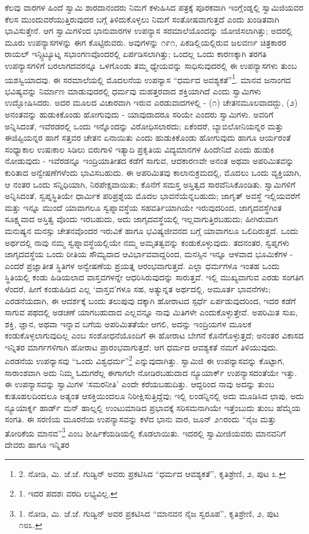 ಕೆಲವು ವಾರಗಳ ಹಿಂದೆ ಸ್ವಾಮಿ ಶಾರದಾನಂದರು ನಿಮಗೆ ಕಳುಹಿಸಿದ ಪತ್ರಕ್ಕೆ ಪೂರಕವಾಗಿ ಇಂಗ್ಲೆಂಡ್ನಲ್ಲಿ ಸ್ವಾಮಿಜಿಯವರ ಕೆಲಸ ಮುಂದುವರೆಯುತ್ತಿರುವುದರ ಬಗ್ಗೆ ತಿಳಿದುಕೊಳ್ಳಲು ನಿಮಗೆ ಸಂತೋಷವಾಗುತ್ತದೆ ಎಂದು ಖಂಡಿತವಾಗಿ ಭಾವಿಸುತ್ತೇನೆ. ಆಗ ಸ್ವಾಮಿಗಳಿಂದ ಭಾನುವಾರಗಳ ಉಪನ್ಯಾಸ ಸರಮಾಲೆಯೊಂದನ್ನು ಯೋಜಿಸಲಾಗಿತ್ತು; ಅದರಲ್ಲಿ ಮೂರು ಉಪನ್ಯಾಸಗಳನ್ನು ಈಗ ಕೊಟ್ಟಿರುವರು. ಅವುಗಳನ್ನು ೧೯೧, ಪಿಕಡಿಲ್ಲಿಯಲ್ಲಿರುವ ಜಲವರ್ಣ ಚಿತ್ರಕಾರರ ರಾಯಲ್ ಇನ್ಸ್ಪಿಟ್ಯೂಟ್ನ ಸಭಾಂಗಣವೊಂದರಲ್ಲಿ ಏರ್ಪಡಿಸಲಾಗಿತ್ತು; ಒಂದಲ್ಲ ಒಂದು ಕಾರಣಕ್ಕಾಗಿ ತರಗತಿ ಉಪನ್ಯಾಸಗಳಿಗೆ ಬರಲಾಗದವರನ್ನೂ ಒಳಗೊಂಡು ತಮ್ಮ ಧ್ಯೇಯವನ್ನು ಸಾಧಿಸುವುದರಲ್ಲಿ ಈ ಉಪನ್ಯಾಸಗಳು ತುಂಬ ಯಶಸ್ವಿಯಾದವು. ಈ ಸರಮಾಲೆಯಲ್ಲಿ ಮೊದಲನೆಯ ಉಪನ್ಯಾಸ “ಧರ್ಮದ ಅವಶ್ಯಕತೆ”\footnote{2. ನೋಡಿ, ಮಿ. ಜೆ.ಜೆ. ಗುಡ್ವಿನ್ ಅವರು ಪ್ರಕಟಿಸಿದ “ಧರ್ಮದ ಆವಶ್ಯಕತೆ”, ಕೃತಿಶ್ರೇಣಿ, ೨, ಪುಟ ೩.}. ಮಾನವ ಜನಾಂಗದ ಭವಿಷ್ಯವನ್ನು ನಿರ್ಮಾಣ ಮಾಡುವುದರಲ್ಲಿ ಧರ್ಮವು ಮಹತ್ತರವಾದ ಶಕ್ತಿಯಾಗಿದೆ ಎಂದು ಸ್ವಾಮಿಗಳು ಉದ್ಘೋಷಿಸಿದರು. ಅದರ ಮೂಲದ ವಿಚಾರವಾಗಿ ಇರುವ ಎರಡುವಾದಗಳಲ್ಲಿ - (೧) ಚೇತನಮೂಲವಾದದ್ದು, (೨) ಅನಂತವನ್ನು ಹುಡುಕಿಕೊಂಡು ಹೋಗುವುದು - ಯಾವುದಾದರೂ ಸರಿಯೇ ಎಂದರು ಸ್ವಾಮಿಗಳು. ಅವರಿಗೆ ಅನ್ನಿಸಿದಂತೆ, ಇವೆರಡರಲ್ಲಿ ಒಂದು ಇನ್ನೊಂದನ್ನು ವಿರೋಧಿಸಲಾರದು; ಏಕೆಂದರೆ, ಬ್ಯಾಬಿಲೋನಿಯನ್ನರ ಮತ್ತು ಈಜಿಪ್ಟಿಯನ್ನರ ಹಾಗೆ ಸತ್ತವರ ಚೇತನ ಏನಾಯಿತು ಎಂದು ಹುಡುಕಿಕೊಂಡು ಹೋಗುವುದು ಹಾಗೂ ಆರ್ಯರಂತೆ ಸಂಧ್ಯಾಕಾಲ ಉಷಃಕಾಲ ಸಿಡಿಲು ಬಿರುಗಾಳಿ ಇತ್ಯಾದಿ ಪ್ರಕೃತಿಯ ವಿದ್ಯಮಾನಗಳ ಹಿಂದೇನಿದೆ ಎಂದು ಹುಡುಕಿ ನೋಡುವುದು - ಇವೆರಡನ್ನೂ ಇಂದ್ರಿಯಾತೀತದ ಕಡೆಗೆ ಸಾಗುವ, ಆದಕಾರಣವೇ ಅನಂತ ಅಥವಾ ಅಪರಿಮಿತವನ್ನು ಕುರಿತಾದ ಅನ್ವೇಷಣೆಗಳೆಂದು ಭಾವಿಸಬಹುದು. ಈ ಅಪರಿಮಿತವು ಕಾಲಾನುಕ್ರಮದಲ್ಲಿ, ಮೊದಲು ಒಂದು ವ್ಯಕ್ತಿಯಾಗಿ, ಆ ನಂತರ ಒಂದು ಸನ್ನಿಧಿಯಾಗಿ, ನಿರಪೇಕ್ಷವಾಯಿತು; ಕೊನೆಗೆ ಸಮಸ್ತ ಅಸ್ತಿತ್ವದ ಸಾರವೆನಿಸಿಕೊಂಡಿತು. ಸ್ವಾಮಿಗಳಿಗೆ ಅನ್ನಿಸಿದಂತೆ, ಸ್ವಪ್ನಸ್ಥಿತಿಯೇ ಧಾರ್ಮಿಕ ಪರಿಪ್ರಶ್ನೆಯ ಮೊದಲ ಭಾವನೆಯೆನ್ನಬಹುದು; ಜಾಗೃತ್ ಅವಸ್ಥೆ ಇಲ್ಲಿಯವರೆಗೆ ಮತ್ತು ಇನ್ನೂ ಮುಂದೆ ಯಾವಾಗಲೂ ಸ್ವಪ್ನಾವಸ್ಥೆಯ ಸಹವರ್ತಿಯಾಗಿಯೇ ಇರುವುದರಿಂದ, ಜಾಗೃದವಸ್ಥೆಗಿಂತ ಸೂಕ್ಷ್ಮವಾದ ಅಸ್ತಿತ್ವ ವೊಂದು ಇರಬಹುದು, ಅದು ಜಾಗೃದವಸ್ಥೆಯಲ್ಲಿ ಇಲ್ಲವಾಗುತ್ತಿರಬಹುದು; ಹೀಗಿರುವಾಗ ಮನುಷ್ಯನ ಮನಸ್ಸು ಚೇತನವೊಂದರ ಇರುವಿಕೆ ಹಾಗೂ ಭವಿಷ್ಯಜೀವನದ ಬಗ್ಗೆ ಯಾವಾಗಲೂ ಒಲಿದಿರುತ್ತದೆ. ಒಂದು ಅರ್ಥದಲ್ಲಿ ನಾವು ನಮ್ಮ ಸ್ವಪ್ನಾವಸ್ಥೆಯಲ್ಲಿಯೇ ನಮ್ಮ ಅಮೃತತ್ವವನ್ನು ಕಂಡುಕೊಳ್ಳುವುದು. ತದನಂತರ, ಸ್ವಪ್ನಗಳು ಜಾಗೃದವಸ್ಥೆಯ ಒಂದು ರೀತಿಯ ಸೌಮ್ಯವಾದ ಆವಿರ್ಭಾವವಾದ್ದರಿಂದ, ಮನಸ್ಸಿನ ಇನ್ನೂ ಆಳವಾದ ಭೂಮಿಕೆಗಳ - ಎಂದರೆ ಪ್ರಜ್ಞಾತೀತ ಸ್ಥಿತಿಗಳ ಅನ್ವೇಷಣೆಯ ಪ್ರಯತ್ನ ಆರಂಭವಾಗುತ್ತದೆ. ಎಲ್ಲಾ ಧರ್ಮಗಳೂ ಇಂತಹ ಒಂದು ಸ್ಥಿತಿಯಲ್ಲಿ ಕಂಡು ಹಿಡಿಯಲಾದ ವಾಸ್ತವಗಳನ್ನೇ ಆಧರಿಸಿರುವುದನ್ನು ಸಾರುತ್ತವೆ. ಇಲ್ಲಿ ಮುಖ್ಯವಾಗುವ ಎರಡು ಸಂಗತಿಗ ಳೆಂದರೆ, ಹೀಗೆ ಕಂಡುಹಿಡಿದ ಎಲ್ಲ ‘ವಾಸ್ತವ’ಗಳೂ ಸಹ, ಅತ್ಯುನ್ನತ ಅರ್ಥದಲ್ಲಿ, ಅಮೂರ್ತ ಭಾವನೆಗಳು; ಎರಡನೆಯದಾಗಿ, ಈ ಆದರ್ಶಕ್ಕೆ ಬಂದು ತಲುಪುವು ದಕ್ಕಾಗಿ ಹೋರಾಟದ ಸ್ಪರ್ಧೆ ಏರ್ಪಡುವುದರಿಂದ, ಇದರ ಕಡೆಗೆ ಸಾಗುವ ಪಥದಲ್ಲಿ ಅಡಚಣೆ ಯಾಗಬಹುದಾದ ಎಲ್ಲವನ್ನೂ ನಾವು ಮಿತಿಗಳೇ ಎಂದುಕೊಳ್ಳುತ್ತೇವೆ. ಅಪರಿಮಿತ ಸುಖ, ಶಕ್ತಿ, ಜ್ಞಾನ, ಅಥವಾ ಇನ್ನಾವ ಬಗೆಯ ಅಪರಿಮಿತತೆಯೇ ಆಗಲಿ, ಅದನ್ನು ಇಂದ್ರಿಯಗಳ ಮೂಲಕ ಕಂಡುಕೊಳ್ಳಲಾಗುವುದಿಲ್ಲ ಎಂಬ ಸಂಶೋಧನೆಯೊಂದಿಗೆ ಈ ಹೋರಾಟ ಬೇಗನೆ ಕೊನೆಗೊಳ್ಳುತ್ತದೆ; ಅನಂತರ ವಿಕಾಸದ ಇನ್ನಿತರ ಮಾರ್ಗಗಳಿಗಾಗಿ ಹೋರಾಟ ಪ್ರಾರಂಭವಾಗುತ್ತದೆ; ಆಗ ಧರ್ಮದ ಆವಶ್ಯಕತೆ ನಮಗೆ ತಿಳಿಯುವುದು. ಎರಡನೆಯ ಉಪನ್ಯಾಸವು “ಒಂದು ವಿಶ್ವಧರ್ಮ”\footnote{1. ಇದರ ಪದಶಃ ವರದಿ ಲಭ್ಯವಿಲ್ಲ.} ಎನ್ನುವುದಾಗಿತ್ತು. ಸ್ವಾಮಿಜಿ ಈ ಉಪನ್ಯಾಸವನ್ನು ಕೊಟ್ಟಾಗ, ಸಾರಾಂಶವಾಗಿ ಅದು ನಿಮ್ಮ ಓದುಗರೆಲ್ಲ ಈಗಾಗಲೇ ನೋಡಿರಬಹುದಾದ ನ್ಯೂಯಾರ್ಕ್ ಉಪನ್ಯಾಸದಂತೆಯೇ ಇತ್ತು. ಈ ಉಪನ್ಯಾಸವನ್ನು ಸ್ವಾಮಿಗಳ ‘ಸಮರನೀತಿ’ ಎಂದೇ ಕರೆಯಬಹುದಿತ್ತು. ಆದ್ದರಿಂದ ನಾವು ಅದನ್ನು ತುಂಬ ಕುತೂಹಲದಿಂದಲೂ ಅತ್ಯಂತ ಆಸಕ್ತಿಯಿಂದಲೂ ನಿರೀಕ್ಷಿಸುತ್ತಿದ್ದೆವು; ಇಲ್ಲಿ ಲಂಡನ್ನಿನಲ್ಲಿ ಅದು ಮೂಡಿಸಿದ ಛಾಪು, ಅದು ನ್ಯೂಯಾರ್ಕ್ನ ಹಾರ್ಡ್ ಮನ್ ಹಾಲ್ನಲ್ಲಿ ಉಂಟುಮಾಡಿದ ಪ್ರಭಾವಕ್ಕೆ ಸರಿಸಮನಾಗಿಯೇ ಇತ್ತೆಂಬುದು ತುಂಬ ಹೆಮ್ಮೆಯ ಸಂಗತಿ. ಈ ಸರಣಿಯ ಮೂರನೆಯ ಉಪನ್ಯಾಸವನ್ನು ಕಳೆದ ಭಾನು ವಾರ, ಜೂನ್ ೨೧ರಂದು “ನೈಜ ಮತ್ತು ತೋರಿಕೆಯ ಮಾನವ”\footnote{1. ನೋಡಿ, ಮಿ. ಜೆ.ಜೆ. ಗುಡ್ವಿನ್ ಅವರ ಪ್ರಕಟಿಸಿದ “ಮಾನವನ ನೈಜ ಸ್ವರೂಪ”, ಕೃತಿಶ್ರೇಣಿ, ೨, ಪುಟ ೧೮೩.} ಎಂಬ ಶೀರ್ಷಿಕೆಯಡಿಯಲ್ಲಿ ಕೊಡಲಾಯಿತು. ಇದರಲ್ಲಿ ಸ್ವಾಮೀಜಿಯವರು ಮಾನವನಿಗೆ ದೇವರು ಹಾಗೂ ಇನ್ನಿತರ 